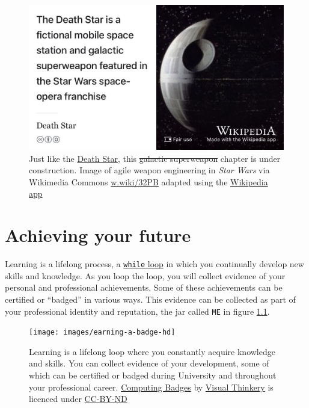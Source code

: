 \documentclass[
]{book}
\begin{document}
\begin{figure}

{\centering \includegraphics[width=0.99\linewidth]{images/DeathStar2} 

}

\caption{Just like the \href{https://en.wikipedia.org/wiki/Death_Star}{Death Star}, this \sout{galactic superweapon} chapter is under construction. Image of agile weapon engineering in \emph{Star Wars} via Wikimedia Commons \href{https://w.wiki/32PB}{w.wiki/32PB} adapted using the \href{https://apps.apple.com/gb/app/wikipedia/id324715238}{Wikipedia app}}\label{fig:deathstar7-fig}
\end{figure}

\hypertarget{achieving}{%
\chapter{Achieving your future}\label{achieving}}

Learning is a lifelong process, a \href{https://en.wikipedia.org/wiki/While_loop}{\texttt{while} loop} in which you continually develop new skills and knowledge. As you loop the loop, you will collect evidence of your personal and professional achievements. Some of these achievements can be certified or ``badged'' in various ways. This evidence can be collected as part of your professional identity and reputation, the jar called \texttt{ME} in figure \ref{fig:while-learning-fig}.

\begin{figure}

{\centering \texttt{[image: images/earning-a-badge-hd]} 

}

\caption{Learning is a lifelong loop where you constantly acquire knowledge and skills. You can collect evidence of your development, some of which can be certified or badged during University and throughout your professional career. \href{https://bryanmmathers.com/computing-badges/}{Computing Badges} by \href{https://visualthinkery.com/}{Visual Thinkery} is licenced under \href{https://creativecommons.org/licenses/by-nd/4.0/}{CC-BY-ND}}\label{fig:while-learning-fig}
\end{figure}
\end{document}
